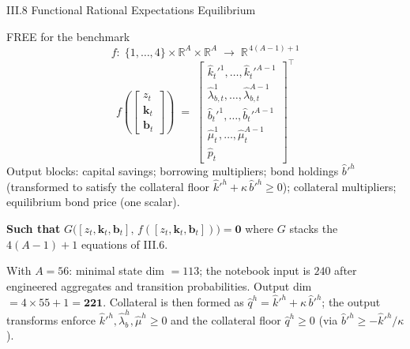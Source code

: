 \documentclass[aspectratio=169,11pt]{beamer}
\newcommand{\R}{\mathbb{R}}
\begin{document}
\begin{frame}{III.8 Functional Rational Expectations Equilibrium}
\small
\begin{exampleblock}{FREE for the benchmark}
\vspace{-3pt}
\[
f:\;\{1,\ldots,4\}\times \R^{A}\times \R^{A} \;\longrightarrow\; \R^{\,4(A-1)+1}
\]
\[
f\!\left(\!\begin{bmatrix} z_t \\ \bm{k}_t \\ \bm{b}_t \end{bmatrix}\!\right)
\;=\;
\begin{bmatrix}
\hat{k}_t'^1,\ldots,\hat{k}_t'^{A-1} \\
\hat\lambda_{b,t}^1,\ldots,\hat\lambda_{b,t}^{A-1} \\
\hat{b}_t'^1,\ldots,\hat{b}_t'^{A-1} \\
\hat \mu_{t}^{1},\ldots,\hat \mu_{t}^{A-1} \\
\hat p_t
\end{bmatrix}^{\!\top}
\]
{\footnotesize Output blocks: capital savings; borrowing multipliers; bond holdings $\hat b'^h$ (transformed to satisfy the collateral floor $\hat k'^h + \kappa\,\hat b'^h \ge 0$); collateral multipliers; equilibrium bond price (one scalar).}
\vspace{-3pt}\end{exampleblock}

\textbf{Such that} $G\bigl([z_t, \bm{k}_t, \bm{b}_t],\,f([z_t, \bm{k}_t, \bm{b}_t])\bigr) = \bm{0}$ where $G$ stacks the $4(A-1)+1$ equations of III.6.

\vspace{0.3em}
{\footnotesize With $A = 56$: minimal state dim $=113$; the notebook input is $240$ after engineered aggregates and transition probabilities.  Output dim $=4\times55+1=\bm{221}$.  Collateral is then formed as $\hat q^h=\hat k'^h+\kappa\,\hat b'^h$; the output transforms enforce $\hat k'^h,\hat\lambda_b^h,\hat\mu^h\ge0$ and the collateral floor $\hat q^h\ge0$ (via $\hat b'^h\ge-\hat k'^h/\kappa$).}
\end{frame}
\end{document}
